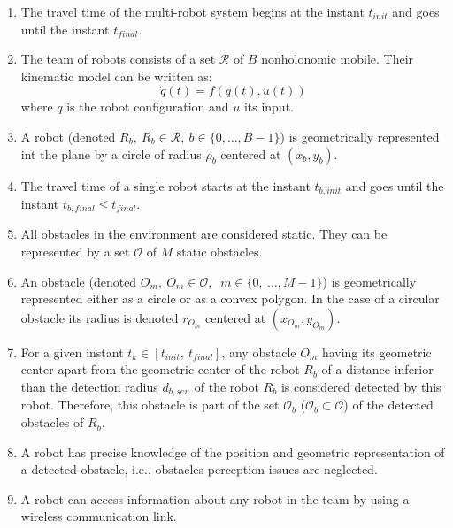 \begin{enumerate}

    \item The travel time of the multi-robot system begins at
    the instant $t_{init}$ and goes until the instant $t_{final}$.

    \item The team of robots consists of a set $\mathcal{R}$ of $B$
    nonholonomic mobile. Their kinematic model can be written as:
    $$
    \dot{q}(t) = f(q(t),u(t))
    $$
    where $q$ is the robot configuration and $u$ its input.

    \item A robot (denoted $R_b,\ R_b \in \mathcal{R},\ b \in \{0,\dots,B-1\}$) is 
    geometrically represented int the plane by a circle of radius $\rho_b$ centered at
    $(x_b, y_b)$.
    
    \item The travel time of a single robot starts at
    the instant $t_{b,init}$ and goes until the instant $t_{b,final} \leq t_{final}$.   
        
    \item All obstacles in the environment are considered static. They can be
    represented by a set $\mathcal{O}$ of $M$ static obstacles.
    
    \item An obstacle (denoted $O_m,\ $\mbox{$O_m \in \mathcal{O}$}$,\ $
    \mbox{$m \in \{0,\ \dots, M-1\}$}) is geometrically represented either as
    a circle or as a convex polygon. In the case of a circular obstacle its
    radius is denoted $r_{O_m}$ centered at $(x_{O_m},y_{O_m})$.
    
    \item For a given instant $t_k \in [t_{init},\ t_{final}]$, any obstacle
    $O_m$ having its geometric center apart from the geometric center of the
    robot $R_b$ of a distance inferior than the detection radius $d_{b,sen}$
    of the robot $R_b$ is considered detected by this robot.
    Therefore, this obstacle is part of the set $\mathcal{O}_b$
    ($\mathcal{O}_b \subset \mathcal{O}$) of the detected obstacles of $R_b$.
    
    \item A robot has precise knowledge of the position and geometric 
    representation of a detected obstacle, i.e., obstacles perception issues
    are neglected.
    
    \item A robot can access 
    information about any robot in the team by using 
    a wireless communication link.
    

\end{enumerate}
